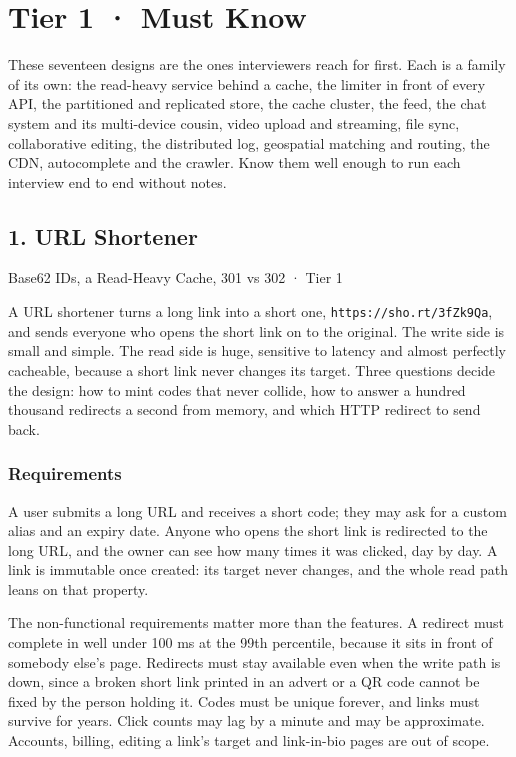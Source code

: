 \documentclass[
  letterpaper,
  oneside,
  11pt,
  openany]{scrbook}
\begin{document}
\chapter{Tier 1 · Must Know}\label{tier1}


These seventeen designs are the ones interviewers reach for first. Each
is a family of its own: the read-heavy service behind a cache, the
limiter in front of every API, the partitioned and replicated store, the
cache cluster, the feed, the chat system and its multi-device cousin,
video upload and streaming, file sync, collaborative editing, the
distributed log, geospatial matching and routing, the CDN, autocomplete
and the crawler. Know them well enough to run each interview end to end
without notes.

\clearpage

\section{1. URL Shortener}\label{d1}


{\sffamily\small\color{muted}Base62 IDs, a Read-Heavy Cache, 301 vs 302
· Tier 1}

A URL shortener turns a long link into a short one,
\texttt{https://sho.rt/3fZk9Qa}, and sends everyone who opens the short
link on to the original. The write side is small and simple. The read
side is huge, sensitive to latency and almost perfectly cacheable,
because a short link never changes its target. Three questions decide
the design: how to mint codes that never collide, how to answer a
hundred thousand redirects a second from memory, and which HTTP redirect
to send back.

\subsection{Requirements}\label{requirements}

A user submits a long URL and receives a short code; they may ask for a
custom alias and an expiry date. Anyone who opens the short link is
redirected to the long URL, and the owner can see how many times it was
clicked, day by day. A link is immutable once created: its target never
changes, and the whole read path leans on that property.

The non-functional requirements matter more than the features. A
redirect must complete in well under 100 ms at the 99th percentile,
because it sits in front of somebody else's page. Redirects must stay
available even when the write path is down, since a broken short link
printed in an advert or a QR code cannot be fixed by the person holding
it. Codes must be unique forever, and links must survive for years.
Click counts may lag by a minute and may be approximate. Accounts,
billing, editing a link's target and link-in-bio pages are out of scope.
\end{document}
